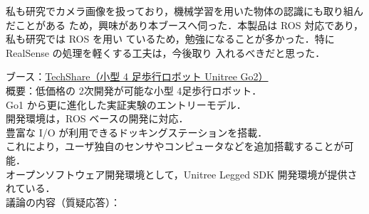 \documentclass{jsarticle}
\begin{document}
\hspace*{5.7zw}私も研究でカメラ画像を扱っており，機械学習を用いた物体の認識にも取り組んだことがある
\hspace*{6.7zw}ため，興味があり本ブースへ伺った．本製品は ROS 対応であり，私も研究では ROS を用い
\hspace*{6.7zw}ているため，勉強になることが多かった．特に RealSense の処理を軽くする工夫は，今後取り
\hspace*{6.7zw}入れるべきだと思った．


\newpage

\vspace*{-10zh}

\hspace*{4.7zw}ブース：\underline{TechShare（小型 4 足歩行ロボット Unitree Go2）}\\

\hspace*{4.7zw}概要：低価格の 2次開発が可能な小型 4足歩行ロボット．\\
\hspace*{8.7zw}Go1 から更に進化した実証実験のエントリーモデル．\\
\hspace*{8.7zw}開発環境は，ROS ベースの開発に対応．\\
\hspace*{8.7zw}豊富な I/O が利用できるドッキングステーションを搭載．\\
\hspace*{8.7zw}これにより，ユーザ独自のセンサやコンピュータなどを追加搭載することが可能．\\
\hspace*{8.7zw}オープンソフトウェア開発環境として，Unitree Legged SDK 開発環境が提供されている．\\


\hspace*{4.7zw}議論の内容（質疑応答）：
\end{document}
